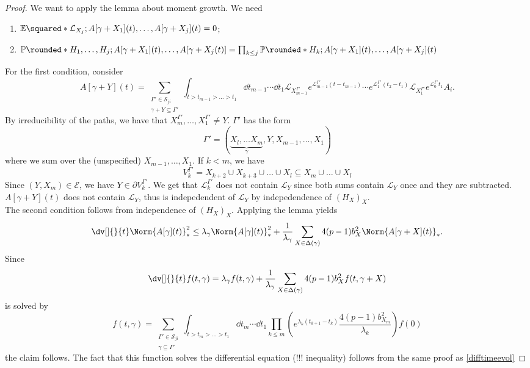 \begin{proof}
    We want to apply the lemma about moment growth. We need 
    \begin{enumerate}[1)]
      \item \(\mathbb{E}\squared*{\mathcal{L}_{X_j}; A[\gamma+X_1](t), \dots, A[\gamma+ X_j](t)}=0\); 
      \item \( \mathbb{P}\rounded*{H_1, \dots, H_j; A[\gamma +X_1](t), \dots, A[\gamma + X_j(t)]} = \prod_{k \leq j} \mathbb{P}\rounded*{H_k; A[\gamma+X_1](t), \dots, A[\gamma+X_j](t)}\)
    \end{enumerate}
    For the first condition, consider 
    \[ A[\gamma + Y](t) = \sum_{\substack{\Gamma ' \in \mathcal{S}_{ji} \\ \gamma + Y \subseteq \Gamma '}}^{}  \int_{t > t_{m-1} > \dots > t_1}^{}  \dd{t_{m-1}} \cdots \dd{t_{1}} \mathcal{L}_{X_{m-1}^{\Gamma '}} e^{\mathcal{L}_{m-1}^{\Gamma '}(t-t_{m-1})} \cdots e^{\mathcal{L}_1^{\Gamma '}(t_2-t_1)}\mathcal{L}_{X_1^{\Gamma '}} e^{\mathcal{L}_0^{\Gamma '}t_1} A_i.\]
    By irreducibility of the paths, we have that \( X_m^{\Gamma '}, \dots, X_1^{\Gamma '}\neq Y. \) \( \Gamma ' \) has the form 
    \[ \Gamma '=( \underbrace{X_l, \dots X_m}_{\gamma}, Y, X_{m-1}, \dots, X_1) \] where we sum over the (unspecified) \( X_{m-1}, \dots, X_1 \). If \( k < m \), we have 
    \[ V_k^{\Gamma '} = X_{k+2} \cup X_{k+3} \cup \dots \cup X_l  \subseteq X_m \cup \dots \cup X_l\]
    Since \( (Y,X_m) \in \mathcal{E} \), we have \( Y \in \partial V_k^{\Gamma '} \). We get that \( \mathcal{L}_k^{\Gamma '} \) does not contain \( \mathcal{L}_Y \) since both sums contain \( \mathcal{L}_Y \) once and they are subtracted. \( A[\gamma+Y](t) \) does not contain \( \mathcal{L}_Y \), thus is indepedendent of \( \mathcal{L}_Y \) by indepedendence of \( (H_X)_X \). \\
    The second condition follows from independence of \( (H_X)_X \).
    Applying the lemma yields
    \[ \dv[]{}{t} \Norm{A[\gamma](t)}_{*}^{2} \leq \lambda_{\gamma} \Norm{A[\gamma](t)}_{*}^{2} + \frac{1}{\lambda_{\gamma}} \sum_{X \in \Delta(\gamma)}^{} 4(p-1) b_X^{2} \Norm{A[\gamma+X](t)}_{*}.  \]
    Since 
    \[ \dv[]{}{t} f(t, \gamma) = \lambda_{\gamma } f(t,\gamma) + \frac{1}{\lambda_{\gamma }}\sum_{X\in \Delta(\gamma )}^{} 4(p-1) b_X^{2}f(t,\gamma+X) \]
    is solved by 
    \[ f(t,\gamma ) = \sum_{\substack{\Gamma ' \in \mathcal{S}_{ji} \\ \gamma \subseteq \Gamma '}}^{} \int_{t > t_m > \dots > t_1}^{}  \dd{t_m} \cdots \dd{t_1} \prod_{k \leq m}^{}\left( e^{\lambda_k(t_{k+1}-t_k)} \frac{4(p-1)b_{X_m}^{2}}{\lambda_k} \right) f(0) \]
    the claim follows. The fact that this function solves the differential equation (!!! inequality) follows from the same proof as \ref{difftimeevol}
\end{proof}

